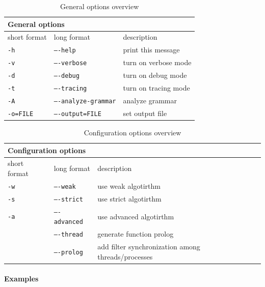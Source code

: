 \begin{table}[h]
\centering
	\begin{tabular}{||l|l|p{6cm}||}
	\hline
	\multicolumn{3}{||l||}{\textbf{General options}}              \\ \hline\hline
	short format & long format         & description \\ \hline
	\texttt{-h}           & \texttt{----help}              & print this message \\
	\texttt{-v}           & \texttt{----verbose}           & turn on verbose mode \\
	\texttt{-d}           & \texttt{----debug}             & turn on debug mode \\
	\texttt{-t}           & \texttt{----tracing}           & turn on tracing mode \\
	\texttt{-A}           & \texttt{----analyze-grammar} & analyze grammar \\
	\texttt{-o=FILE}      & \texttt{----output=FILE}       &  set output file \\ \hline
	\end{tabular}
	\caption{General options overview}
	\label{my-label}
\end{table}

\begin{table}[h]
\centering
	\begin{tabular}{||l|l|p{6cm}||}
	\hline
	\multicolumn{3}{||l||}{\textbf{Configuration options}}              \\ \hline\hline
	short format & long format         & description \\ \hline
	\texttt{-w}           & \texttt{----weak}         & use weak algotirthm \\
	\texttt{-s}           & \texttt{----strict}       & use strict algotirthm \\
	\texttt{-a}           & \texttt{----advanced}     & use advanced algotirthm \\
	                      & \texttt{----thread}       & generate function prolog \\
	                      & \texttt{----prolog}       & add filter synchronization among threads/processes \\ \hline
	\end{tabular}
	\caption{Configuration options overview}
	\label{my-label}
\end{table}


\paragraph{Examples} \hspace{0pt} \\

